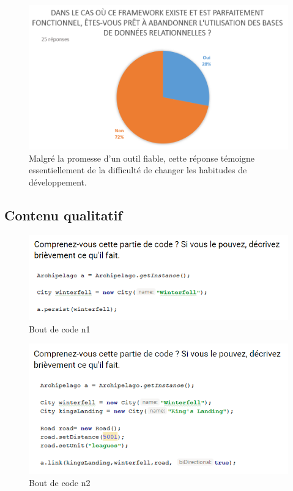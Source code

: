 \documentclass[a4paper,fleqn,12pt,oneside]{report}
\begin{document}
\begin{figure}[!ht]
\centering
\includegraphics[scale=0.8]{figures/QAbanFilt.png}
\caption{Malgré la promesse d'un outil fiable, cette réponse témoigne essentiellement de la difficulté de changer les habitudes de développement.}
\label{fig:QAbanFilt}
\end{figure}

\newpage
{}
\newpage
{}
\newpage
{}
\newpage
{}
\newpage
\subsection{Contenu qualitatif}

\begin{figure}[!ht]
\centering
\includegraphics[scale=0.8]{figures/Snippet1.png}
\caption{Bout de code n1}
\label{fig:Snippet1}
\end{figure}

\begin{figure}[!ht]
\centering
\includegraphics[scale=0.8]{figures/Snippet2.png}
\caption{Bout de code n2}
\label{fig:Snippet2}
\end{figure}
\end{document}

